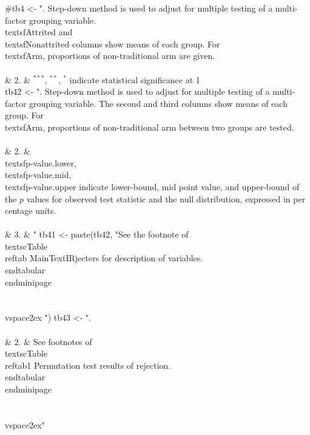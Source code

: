 \begin{Schunk}
\begin{Sinput}
#tb4 <- ". Step-down method is used to adjust for multiple testing of a multi-factor grouping variable. \\textsf{Attrited} and \\textsf{Nonattrited} columns show means of each group. For \\textsf{Arm}, proportions of non-traditional arm are given. \\\\& 2. & ${}^{***}$, ${}^{**}$, ${}^{*}$ indicate statistical significance at 1\\%, 5\\%, 10\\%, respetively. Standard errors are clustered at group (village) level.  \\\\& 3. & See the footnote of \\textsc{Table \\ref{tab MainTextIRjecters}} for description of variables. \\end{tabular}\\end{minipage}\\\\\\vspace{2ex}"
tb42 <- ". Step-down method is used to adjust for multiple testing of a multi-factor grouping variable. The second and third columns show means of each group. For \\textsf{Arm}, proportions of non-traditional arm between two groups are tested. \\\\& 2. & \\textsf{p-value.lower}, \\textsf{p-value.mid}, \\textsf{p-value.upper} indicate lower-bound, mid point value, and upper-bound of the $p$ values for observed test statistic and the null distribution, expressed in per centage units. \\\\& 3. & "
tb41 <- paste(tb42, "See the footnote of \\textsc{Table \\ref{tab MainTextIRjecters}} for description of variables. \\end{tabular}\\end{minipage}\\\\\\vspace{2ex} ")
tb43 <- ".\\\\& 2. &  See footnotes of \\textsc{Table \\ref{tab1 Permutation test results of rejection}}. \\end{tabular}\\end{minipage}\\\\\\vspace{2ex}"

\end{Sinput}
\end{Schunk}
